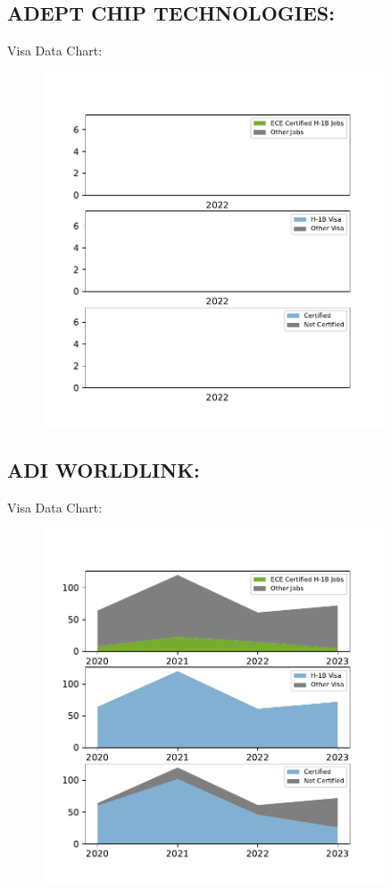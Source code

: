 \documentclass{article}%
\begin{document}
%
\newpage%
\subsection{ADEPT CHIP TECHNOLOGIES:}%
\label{subsec:ADEPTCHIPTECHNOLOGIES}%
Visa Data Chart:%


\begin{figure}[htbp]%
\centering%
\includegraphics[width=0.9\textwidth]{./temp_img/ADEPTCHIPTECHNOLOGIES_detailed.pdf}%
\end{figure}

%
\newpage%
\subsection{ADI WORLDLINK:}%
\label{subsec:ADIWORLDLINK}%
Visa Data Chart:%


\begin{figure}[htbp]%
\centering%
\includegraphics[width=0.9\textwidth]{./temp_img/ADIWORLDLINK_detailed.pdf}%
\end{figure}
\end{document}
